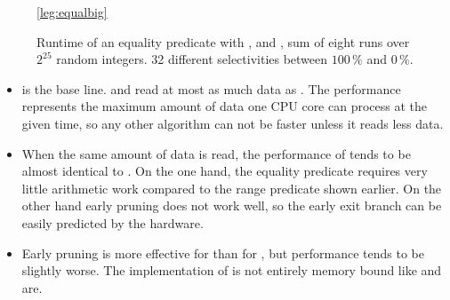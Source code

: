 \begin{figure}[h]
\begin{center}

\ref*{leg:equalbig}
\end{center}
\caption{Runtime of an equality predicate with \simdscan{}, \bwv{} and \bs{},
sum of eight runs over $2^{25}$ random integers. 32 different selectivities
between $100\,\%$ and $0\,\%$.}
\label{fig:eval:equalbig}
\end{figure}

\begin{itemize}
  \item \simdscan{} is the base line. \bwv{} and \bs{} read at most as much data
    as \simdscan{}. The performance represents the maximum amount of data one
    CPU core can process at the given time, so any other algorithm can not be
    faster unless it reads less data.
  \item When the same amount of data is read, the performance of \bwv{} tends to
    be almost identical to \simdscan{}. On the one hand, the equality predicate
    requires very little arithmetic work compared to the range predicate shown
    earlier. On the other hand early pruning does not work well, so the early exit
    branch can be easily predicted by the hardware.
  \item Early pruning is more effective for \bs{} than for \bwv{}, but
    performance tends to be slightly worse. The implementation of \bs{} is not
    entirely memory bound like \simdscan{} and \bwv{} are.
\end{itemize}

